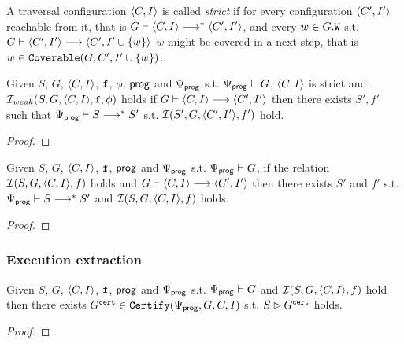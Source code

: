 \documentclass[12pt]{article}
\begin{document}
\begin{definition}
  A traversal configuration $\langle C, I \rangle$ is called \emph{strict}
  if for every configuration $\langle C', I' \rangle$ reachable from it,
  that is $G \vdash \langle C, I \rangle \longrightarrow^* \langle C', I' \rangle$,
  and every $w \in G.{\mathtt{W}}$ s.t.
  $G \vdash \langle C', I' \rangle \longrightarrow \langle C', I' \cup \{w\} \rangle$
  $w$ might be covered in a next step, that is
  $w \in {\mathtt{Coverable}}(G, C', I' \cup \{w\})$.
\end{definition}

\begin{lemma}
  Given $S$, $G$, $\langle C, I \rangle$, ${\mathtt{f}}$, $\phi$, $\mathsf{prog}$ and $\Psi_{\mathsf{prog}}$
  s.t. $\Psi_{\mathsf{prog}} \vdash G$, $\langle C, I \rangle$ is strict
  and $\mathcal{I}_{weak}(S, G, \langle C, I \rangle, {\mathtt{f}}, \phi)$ holds
  if $G \vdash \langle C, I \rangle \longrightarrow \langle C', I' \rangle$ then
  there exists $S', f'$ such that
  $\Psi_{\mathsf{prog}} \vdash S \longrightarrow^* S'$ s.t.
  $\mathcal{I}(S', G, \langle C', I' \rangle, f')$ hold.
\end{lemma}

\begin{proof}

\end{proof}

\begin{lemma}
  Given $S$, $G$, $\langle C, I \rangle$, ${\mathtt{f}}$, $\mathsf{prog}$ and $\Psi_{\mathsf{prog}}$
  s.t. $\Psi_{\mathsf{prog}} \vdash G$,
  if the relation $\mathcal{I}(S, G, \langle C, I \rangle, f)$ holds
  and $G \vdash \langle C, I \rangle \longrightarrow \langle C', I' \rangle$
  then there exists $S'$ and $f'$ s.t.
  $\Psi_{\mathsf{prog}} \vdash S \longrightarrow^* S'$ and
  $\mathcal{I}(S, G, \langle C, I \rangle, f)$ holds.
\end{lemma}

\begin{proof}
  
\end{proof}

\subsubsection{Execution extraction}

\begin{lemma}
  Given $S$, $G$, $\langle C, I \rangle$, ${\mathtt{f}}$, $\mathsf{prog}$ and $\Psi_{\mathsf{prog}}$
  s.t. $\Psi_{\mathsf{prog}} \vdash G$ and $\mathcal{I}(S, G, \langle C, I \rangle, f)$ hold
  then there exists $G^{{\mathtt{cert}}} \in {\mathtt{Certify}}(\Psi_{\mathsf{prog}}, G, C, I)$ s.t.
  $S \rhd G^{{\mathtt{cert}}}$ holds.
\end{lemma}

\begin{proof}
  
\end{proof}
  
\setmonofont[Mapping=tex-text]{CMU Typewriter Text}


\end{document}
